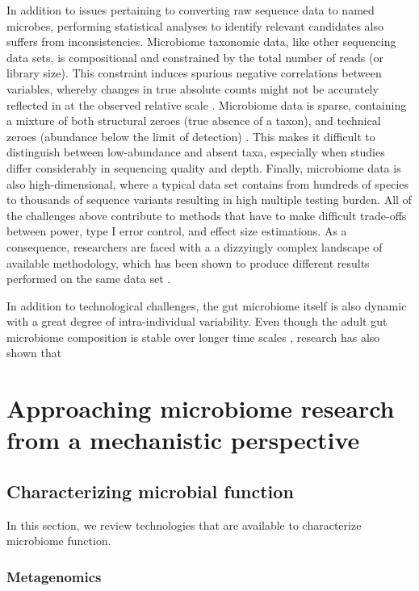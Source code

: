 In addition to issues pertaining to converting raw sequence data to named microbes, performing statistical analyses to identify relevant candidates also suffers from inconsistencies. Microbiome taxonomic data, like other sequencing data sets, is compositional \cite{gloor2017microbiome, quinn2019field} and constrained by the total number of reads (or library size). This constraint induces spurious negative correlations between variables, whereby changes in true absolute counts might not be accurately reflected in at the observed relative scale \cite{lin2020analysis, morton2019establishing}. Microbiome data is sparse, containing a mixture of both structural zeroes (true absence of a taxon), and technical zeroes (abundance below the limit of detection) \cite{kaul2017analysis, silverman2020naught}. This makes it difficult to distinguish between low-abundance and absent taxa, especially when studies differ considerably in sequencing quality and depth. Finally, microbiome data is also high-dimensional, where a typical data set contains from hundreds of species to thousands of sequence variants resulting in high multiple testing burden. All of the challenges above contribute to methods that have to make difficult trade-offs between power, type I error control, and effect size estimations. As a consequence, researchers are faced with a a dizzyingly complex landscape of available methodology, which has been shown to produce different results performed on the same data set \cite{nearing2022microbiome}.   

In addition to technological challenges, the gut microbiome itself is also dynamic with a great degree of intra-individual variability. Even though the adult gut microbiome composition is stable over longer time scales \cite{consortium2012structure}, research has also shown that 


\section{Approaching microbiome research from a mechanistic perspective}

\subsection{Characterizing microbial function}
In this section, we review technologies that are available to characterize microbiome function. 
\subsubsection{Metagenomics}
